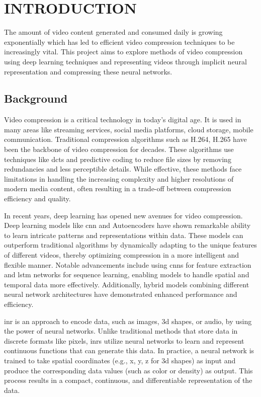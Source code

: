 \documentclass{ioereport}
\begin{document}
\mainsection

\section{\MakeUppercase{Introduction}}
The amount of video content generated and consumed daily is growing exponentially \cite{biteable2021} which has led to efficient video compression techniques to be increasingly vital. This project aims to explore methods of video compression using deep learning techniques and representing videos through implicit neural representation and compressing these neural networks.
    
    \subsection{Background}
    Video compression is a critical technology in today's digital age. It is used in many areas like streaming services, social media platforms, cloud storage, mobile communication. Traditional compression algorithms such as H.264, H.265 have been the backbone of video compression for decades. These algorithms use techniques like \gls{dct}s and predictive coding to reduce file sizes by removing redundancies and less perceptible details. While effective, these methods face limitations in handling the increasing complexity and higher resolutions of modern media content, often resulting in a trade-off between compression efficiency and quality.

    In recent years, deep learning has opened new avenues for video compression. Deep learning models like \gls{cnn} and Autoencoders have shown remarkable ability to learn intricate patterns and representations within data. These models can outperform traditional algorithms by dynamically adapting to the unique features of different videos, thereby optimizing compression in a more intelligent and flexible manner. Notable advancements include using \gls{cnn}s for feature extraction and \gls{lstm} networks for sequence learning, enabling models to handle spatial and temporal data more effectively. Additionally, hybrid models combining different neural network architectures have demonstrated enhanced performance and efficiency. 
    
    \gls{inr} is an  approach to encode data, such as images, \gls{3d} shapes, or audio, by using the power of neural networks. Unlike traditional methods that store data in discrete formats like pixels, \gls{inr}s utilize neural networks to learn and represent continuous functions that can generate this data. In practice, a neural network is trained to take spatial coordinates (e.g., x, y, z for \gls{3d} shapes) as input and produce the corresponding data values (such as color or density) as output. This process results in a compact, continuous, and differentiable representation of the data.
    
\end{document}
